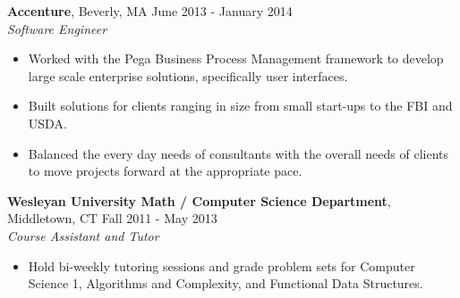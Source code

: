 \documentclass[11pt]{res} %
\begin{document}
\begin{resume}


{\bf Accenture}, Beverly, MA \hfill June 2013 - January 2014 \\
{\it Software Engineer}
\vspace{0.01in} %
   \begin{itemize} \itemsep -2pt  %
   \item Worked with the Pega Business Process Management framework to develop
   large scale enterprise solutions,
   specifically user interfaces.
   \item Built solutions for clients ranging in size from small start-ups to the
     FBI and USDA.
   \item Balanced the every day needs of consultants with the overall needs
     of clients to move projects forward at the appropriate pace.
   \end{itemize}


{\bf Wesleyan University Math / Computer Science Department}, Middletown, CT
\hfill Fall 2011 - May 2013 \\
{\it Course Assistant and Tutor} \\
\vspace{-0.17in}
 \begin{itemize} \itemsep -2pt
   \item Hold bi-weekly tutoring sessions and grade problem sets for Computer
   Science 1, Algorithms and Complexity, and Functional Data Structures.
   \end{itemize}

\vspace{-0.05in} %





\end{resume}
\end{document}
